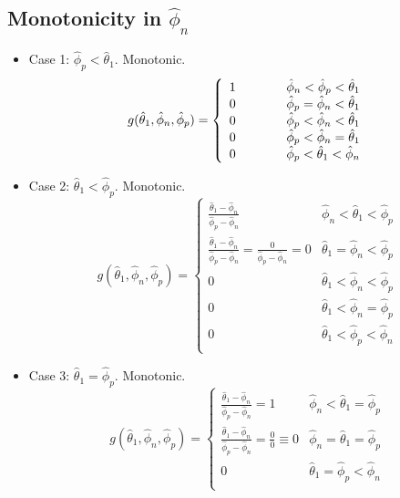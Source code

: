 \subsection{Monotonicity in \texorpdfstring{\( \hat{\phi}_n \)}{ϕ n}}


\begin{itemize}
	\item Case 1: \( \hat{\phi}_p < \hat{\theta}_1 \). Monotonic. \\
\begin{equation}
g(\hat{\theta}_1, \hat{\phi}_n, \hat{\phi}_p)
=
\left\{
\begin{array}{ll}
1 \hspace*{3em} & \hat{\phi}_n < \hat{\phi}_p < \hat{\theta}_1  \\
0 & \hat{\phi}_p = \hat{\phi}_n < \hat{\theta}_1 \\
0 &	\hat{\phi}_p < \hat{\phi}_n < \hat{\theta}_1 \\
0 & \hat{\phi}_p < \hat{\phi}_n = \hat{\theta}_1 \\
0 & \hat{\phi}_p < \hat{\theta}_1 < \hat{\phi}_n \\
\end{array}
\right.
\end{equation}

\item Case 2: \( \hat{\theta}_1 < \hat{\phi}_p \). Monotonic.
\begin{equation}
g(\hat{\theta}_1, \hat{\phi}_n, \hat{\phi}_p)
=
\left\{
\begin{array}{ll}
\frac{\hat{\theta}_1 - \hat{\phi}_n}{\hat{\phi}_p - \hat{\phi}_n} & \hat{\phi}_n < \hat{\theta}_1 < \hat{\phi}_p  \\
\frac{\hat{\theta}_1 - \hat{\phi}_n}{\hat{\phi}_p - \hat{\phi}_n} = \frac{0}{\hat{\phi}_p - \hat{\phi}_n} = 0 & \hat{\theta}_1 = \hat{\phi}_n < \hat{\phi}_p \\
0 &	\hat{\theta}_1 < \hat{\phi}_n < \hat{\phi}_p \\
0 & \hat{\theta}_1 < \hat{\phi}_n = \hat{\phi}_p \\
0 & \hat{\theta}_1 < \hat{\phi}_p < \hat{\phi}_n \\
\end{array}
\right.
\end{equation}

\item Case 3: \( \hat{\theta}_1 = \hat{\phi}_p \). Monotonic. \\
\begin{equation}
g(\hat{\theta}_1, \hat{\phi}_n, \hat{\phi}_p)
=
\left\{
\begin{array}{ll}
\frac{\hat{\theta}_1 - \hat{\phi}_n}{\hat{\phi}_p - \hat{\phi}_n} = 1 & \hat{\phi}_n < \hat{\theta}_1 = \hat{\phi}_p	\\
\frac{\hat{\theta}_1 - \hat{\phi}_n}{\hat{\phi}_p - \hat{\phi}_n} = \frac{0}{0} \equiv 0 & \hat{\phi}_n = \hat{\theta}_1 = \hat{\phi}_p 	\\
0 & \hat{\theta}_1 = \hat{\phi}_p < \hat{\phi}_n	\\
\end{array}
\right.
\end{equation}
\end{itemize}

